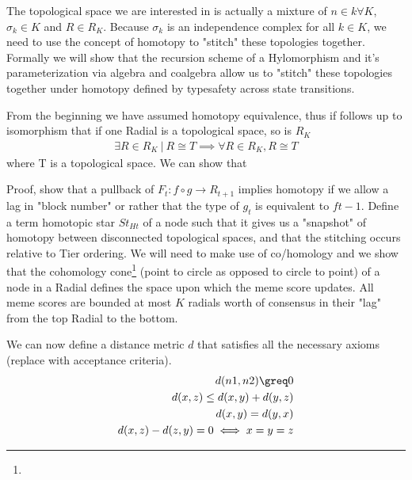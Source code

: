\documentclass{article}
\begin{document}
The topological space we are interested in is actually a mixture of $n \in k \forall K$, $\sigma_k \in K$ and $R \in R_K$. Because $\sigma_k$ is an independence complex for all $k \in K$, we need to use the concept of homotopy to "stitch" these topologies together. Formally we will show that the recursion scheme of a Hylomorphism and it's parameterization via algebra and coalgebra allow us to "stitch" these topologies together under homotopy defined by typesafety across state transitions.

From the beginning we have assumed homotopy equivalence, thus if follows up to isomorphism that if one Radial is a topological space, so is $R_K$
\begin{equation} \label{eq1}
\begin{split}
\exists R \in R_K \ | \ R \cong T \implies \forall R \in R_K,  R \cong T
\end{split}
\end{equation}
where T is a topological space. We can show that 

\begin{center} \label{eq1}
Proof, show that a pullback of $F_t: f \circ g \rightarrow R_{t+1}$ implies homotopy if we allow a lag in "block number" or rather that the type of $g_t$ is equivalent to $f{t-1}$. Define a term homotopic star $St_{Ht}$ of a node such that it gives us a "snapshot" of homotopy between disconnected topological spaces, and that the stitching occurs relative to Tier ordering. We will need to make use of co/homology and we show that the cohomology cone\footnote{} (point to circle as opposed to circle to point) of a node in a Radial defines the space upon which the meme score updates. All meme scores are bounded at most $K$ radials worth of consensus in their "lag" from the top Radial to the bottom.
\end{center}

We can now define a distance metric $d$ that satisfies all the necessary axioms (replace with acceptance criteria).
\begin{equation} \label{eq1}
\begin{split}
d(n1, n2) \greq 0\\
d(x, z) \leq d(x, y) + d(y, z) \\
d(x, y) = d(y, x) \\
d(x, z) - d(z, y) = 0 \iff x = y = z\\
\end{split}
\end{equation}
\end{document}
